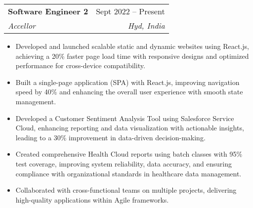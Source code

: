 \documentclass[letterpaper,11pt]{article}
\makeatletter
\newcommand{\resumeItem}[1]{
  \item\small{
    {#1 \vspace{-2pt}}
  }
}
\newcommand{\resumeSubheading}[4]{
  \vspace{-2pt}\item
    \begin{tabular*}{0.97\textwidth}[t]{l@{\extracolsep{\fill}}r}
      \textbf{#1} & #2 \\
      \textit{\small#3} & \textit{\small #4} \\
    \end{tabular*}\vspace{-7pt}
}
\newcommand{\resumeSubSubheading}[2]{
    \item
    \begin{tabular*}{0.97\textwidth}{l@{\extracolsep{\fill}}r}
      \textit{\small#1} & \textit{\small #2} \\
    \end{tabular*}\vspace{-7pt}
}
\newcommand{\resumeSubHeadingListEnd}{\end{itemize}}
\newcommand{\resumeItemListStart}{\begin{itemize}}
\newcommand{\resumeItemListEnd}{\end{itemize}\vspace{-5pt}}
\makeatother
\begin{document}
    \resumeSubheading
      {Software Engineer 2}{Sept 2022 -- Present}
      {Accellor}{Hyd, India}
      \resumeItemListStart
        \resumeItem{Developed and launched scalable static and dynamic websites using React.js, achieving a 20\% faster page load time
with responsive designs and optimized performance for cross-device compatibility.}
        \resumeItem{Built a single-page application (SPA) with React.js, improving navigation speed by 40\% and enhancing the overall
user experience with smooth state management.}
        \resumeItem{Developed a Customer Sentiment Analysis Tool using Salesforce Service Cloud, enhancing reporting and data
visualization with actionable insights, leading to a 30\% improvement in data-driven
decision-making.}
        \resumeItem{Created comprehensive Health Cloud reports using batch classes with 95\% test coverage, improving system reliability, data accuracy, and ensuring compliance with organizational standards in healthcare data management.}
        \resumeItem{Collaborated with cross-functional teams on multiple projects, delivering high-quality applications within Agile frameworks.}
      \resumeItemListEnd


\end{document}
